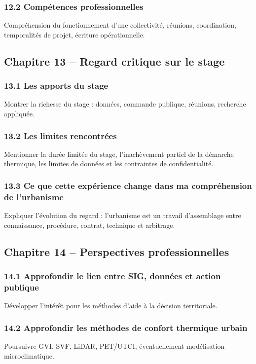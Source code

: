 \documentclass[11pt,a4paper]{article}
\begin{document}
\subsubsection{12.2 Compétences professionnelles}
Compréhension du fonctionnement d'une collectivité, réunions, coordination, temporalités de projet, écriture opérationnelle.

\subsection{Chapitre 13 -- Regard critique sur le stage}

\subsubsection{13.1 Les apports du stage}
Montrer la richesse du stage : données, commande publique, réunions, recherche appliquée.

\subsubsection{13.2 Les limites rencontrées}
Mentionner la durée limitée du stage, l'inachèvement partiel de la démarche thermique, les limites de données et les contraintes de confidentialité.

\subsubsection{13.3 Ce que cette expérience change dans ma compréhension de l'urbanisme}
Expliquer l'évolution du regard : l'urbanisme est un travail d'assemblage entre connaissance, procédure, contrat, technique et arbitrage.

\subsection{Chapitre 14 -- Perspectives professionnelles}

\subsubsection{14.1 Approfondir le lien entre SIG, données et action publique}
Développer l'intérêt pour les méthodes d'aide à la décision territoriale.

\subsubsection{14.2 Approfondir les méthodes de confort thermique urbain}
Poursuivre GVI, SVF, LiDAR, PET/UTCI, éventuellement modélisation microclimatique.
\end{document}
